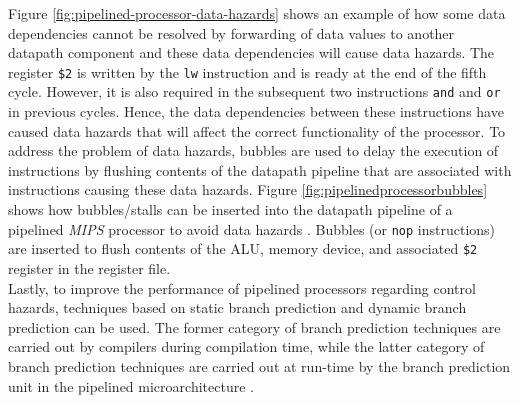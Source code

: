 Figure \ref{fig:pipelined-processor-data-hazards} shows an example of how some data dependencies cannot be resolved by forwarding of data values to another datapath component and these data dependencies will cause data hazards.
The register {\tt \$2} is written by the {\tt lw} instruction and is ready at the end of the fifth cycle. However, it is also required in the subsequent two instructions {\tt and} and {\tt or} in previous cycles. Hence, the data dependencies between these instructions have caused data hazards that will affect the correct functionality of the processor. To address the problem of data hazards, bubbles are used to delay the execution of instructions by flushing contents of the datapath pipeline that are associated with instructions causing these data hazards. Figure \ref{fig:pipelinedprocessorbubbles} shows how bubbles/stalls can be inserted into the datapath pipeline of a pipelined {\it MIPS} processor to avoid data hazards \cite{Patterson2012}. Bubbles (or {\tt nop} instructions) are inserted to flush contents of the ALU, memory device, and associated {\tt \$2} register in the register file. \\


Lastly, to improve the performance of pipelined processors regarding control hazards, techniques based on static branch prediction and dynamic branch prediction can be used. The former category of branch prediction techniques are carried out by compilers during compilation time, while the latter category of branch prediction techniques are carried out at run-time by the branch prediction unit in the pipelined microarchitecture \cite{Hennessy2012,Shen2005a}.







